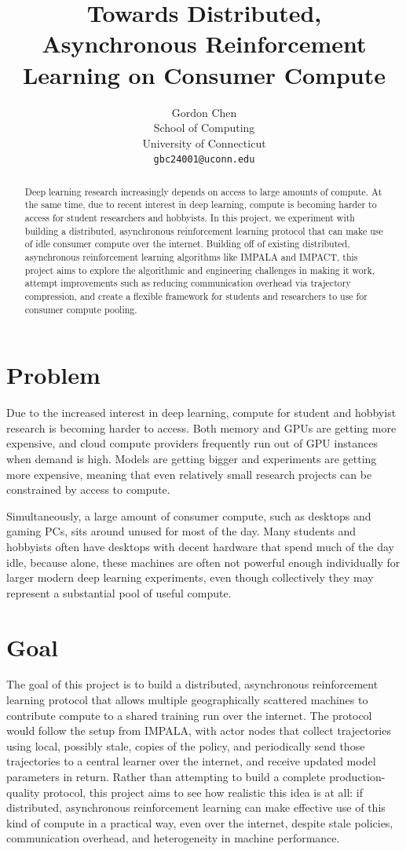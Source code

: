 \documentclass{article}
\title{Towards Distributed, Asynchronous Reinforcement Learning on Consumer Compute}
\author{
Gordon Chen\\
School of Computing\\
University of Connecticut\\
\texttt{gbc24001@uconn.edu}\\
}
\begin{document}
\maketitle

\begin{abstract}
Deep learning research increasingly depends on access to large amounts of compute. At the same time,
due to recent interest in deep learning, compute is becoming harder to access for student researchers
and hobbyists.
In this project, we experiment with building a distributed, asynchronous reinforcement learning protocol
that can make use of idle consumer compute over the internet.
Building off of existing distributed, asynchronous reinforcement learning algorithms like IMPALA and IMPACT,
this project aims to explore the algorithmic and engineering challenges in making it work, attempt
improvements such as reducing communication overhead via trajectory compression, and create a flexible
framework for students and researchers to use for consumer compute pooling.
\end{abstract}


\section{Problem}
Due to the increased interest in deep learning, compute for student and hobbyist research is becoming harder
to access. Both memory and GPUs are getting more expensive, and cloud compute providers frequently run out of
GPU instances when demand is high. Models are getting bigger and experiments are getting more expensive,
meaning that even relatively small research projects can be constrained by access to compute.

Simultaneously, a large amount of consumer compute, such as desktops and gaming PCs,
sits around unused for most of the day. Many students and hobbyists often have desktops with decent hardware
that spend much of the day idle, because alone, these machines are often not powerful enough individually
for larger modern deep learning experiments, even though collectively they may represent a substantial pool
of useful compute.


\section{Goal}
The goal of this project is to build a distributed, asynchronous reinforcement learning protocol that
allows multiple geographically scattered machines to contribute compute to a shared training run
over the internet.
The protocol would follow the setup from IMPALA, with actor nodes that collect trajectories using local,
possibly stale, copies of the policy, and periodically send those trajectories to a central learner
over the internet, and receive updated model parameters in return.
Rather than attempting to build a complete production-quality protocol,
this project aims to see how realistic this idea is at all: if distributed, asynchronous reinforcement
learning can make effective use of this kind of compute in a practical way, even over the internet,
despite stale policies, communication overhead, and heterogeneity in machine performance.
\end{document}
